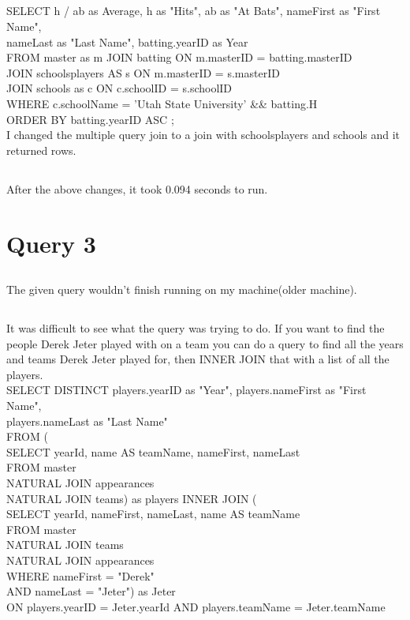 \documentclass[11pt]{article}
\theoremstyle{plain}
\theoremstyle{definition}
\begin{document}
\subsection{}
SELECT h / ab as Average, h as "Hits", ab as "At Bats", nameFirst as "First Name",\\ nameLast as "Last Name", batting.yearID as Year\\
FROM  master as m JOIN batting ON m.masterID = batting.masterID \\
	JOIN schoolsplayers AS s ON m.masterID = s.masterID \\
	JOIN schools as c ON c.schoolID = s.schoolID\\
WHERE c.schoolName = 'Utah State University' && batting.H \\
ORDER BY batting.yearID ASC ;\\

I changed the multiple query join to a join with schoolsplayers and schools and it returned rows.\\
\subsection{}
After the above changes, it took 0.094 seconds to run.
\section{Query 3}
\subsection{}The given query wouldn't finish running on my machine(older machine).
\subsection{}
It was difficult to see what the query was trying to do. If you want to find the people Derek Jeter played with on a team you can do a query to find all the years and teams Derek Jeter played for, then INNER JOIN that with a list of all the players.\\

SELECT DISTINCT players.yearID as "Year", players.nameFirst as "First Name",\\ players.nameLast as "Last Name"\\
    FROM (\\
    SELECT yearId, name AS teamName, nameFirst, nameLast\\
	FROM master\\
	NATURAL JOIN appearances\\
	NATURAL JOIN teams) as players INNER JOIN (\\
    SELECT yearId, nameFirst, nameLast, name AS teamName\\
FROM master\\
	NATURAL JOIN teams\\
	NATURAL JOIN appearances\\
WHERE nameFirst = "Derek"\\
	AND nameLast = "Jeter") as Jeter\\
    ON players.yearID = Jeter.yearId AND players.teamName = Jeter.teamName\\
\end{document}
